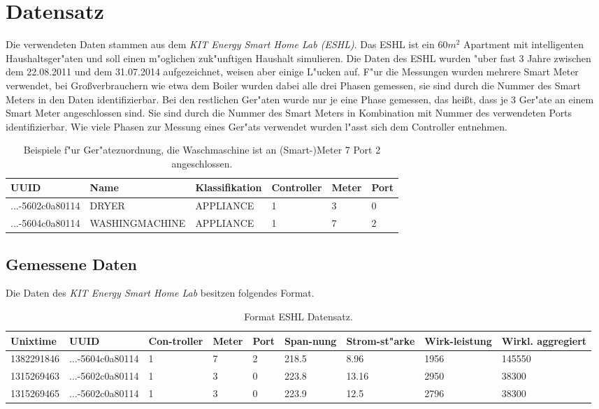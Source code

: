 \section{Datensatz}
\label{Datensatz}

Die verwendeten Daten stammen aus dem \textit{KIT Energy Smart Home Lab (ESHL)}. Das ESHL ist ein $60 m^2$ Apartment mit intelligenten Haushaltsger"aten und soll einen m"oglichen zuk"unftigen Haushalt simulieren. Die Daten des ESHL wurden "uber fast 3 Jahre zwischen dem 22.08.2011 und dem 31.07.2014 aufgezeichnet, weisen aber einige L"ucken auf. F"ur die Messungen wurden mehrere Smart Meter verwendet, bei Gro{\ss}verbrauchern wie etwa dem Boiler wurden dabei alle drei Phasen gemessen, sie sind durch die Nummer des Smart Meters in den Daten identifizierbar. Bei den restlichen Ger"aten wurde nur je eine Phase gemessen, das hei{\ss}t, dass je 3 Ger"ate an einem Smart Meter angeschlossen sind. Sie sind durch die Nummer des Smart Meters in Kombination mit Nummer des verwendeten Ports identifizierbar. Wie viele Phasen zur Messung eines Ger"ats verwendet wurden l"asst sich dem Controller entnehmen.
\begin{table}[h]
\begin{tabular}{l|l|l|l|l|l}
UUID & Name & Klassifikation & Controller & Meter & Port \\
\hline
...-5602c0a80114 & DRYER & APPLIANCE & 1 & 3 & 0 \\
...-5604c0a80114 & WASHINGMACHINE & APPLIANCE & 1 & 7 & 2
\end{tabular}
\caption["Ubersicht Ger"atezuordnung]{Beispiele f"ur Ger"atezuordnung, die Waschmaschine ist an (Smart-)Meter 7 Port 2 angeschlossen.}
\label{profile01458}
\end{table}



\subsection{Gemessene Daten}
\label{Gemessene Daten}

Die Daten des \textit{KIT Energy Smart Home Lab} besitzen folgendes Format. \\
\begin{table}[h]
\begin{tabular}{l|l|p{1cm}|p{1cm}|p{1cm}|p{1cm}|p{1cm}|p{1.2cm}|p{2cm}}
Unixtime & UUID & Con-troller & Meter & Port & Span-nung & Strom-st"arke & Wirk-leistung & Wirkl. \newline aggregiert \\
\hline
1382291846 & ...-5604c0a80114 & 1 & 7 & 2 & 218.5 & 8.96 & 1956 & 145550  \\
1315269463 & ...-5602c0a80114 & 1 & 3 & 0 & 223.8 & 13.16 & 2950 & 38300 \\
1315269465 & ...-5602c0a80114 & 1 & 3 & 0 & 223.9 & 12.5 & 2796 & 38300
\end{tabular}
\caption[Format ESHL Daten]{Format ESHL Datensatz.}
\label{profile01458}
\end{table}

